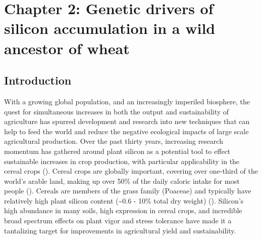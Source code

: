 \documentclass[12pt, letterpaper, ]{report}
\begin{document}
\clearpage



\chapter{Chapter 2: Genetic drivers of silicon accumulation in a wild ancestor of wheat}

\section{Introduction}

With a growing global population, and an increasingly imperiled biosphere, the quest for simultaneous increases in both the output and sustainability of agriculture has spurred development and research into new techniques that can help to feed the world and reduce the negative ecological impacts of large scale agricultural production. Over the past thirty years, increasing research momentum has gathered around plant silicon as a potential tool to effect sustainable increases in crop production, with particular applicability in the cereal crops (\cite{reynolds_silicon_2016,christian_breeding_2022}). Cereal crops are globally important, covering over one-third of the world’s arable land, making up over 50\% of the daily caloric intake for most people (\cite{faostat, rudel_agricultural_2009, awika_major_2011}). Cereals are members of the grass family (Poaceae) and typically have relatively high plant silicon content (\sim0.6 - 10\% total dry weight) (\cite{reynolds_silicon_2016}). Silicon's high abundance in many soils, high expression in cereal crops, and incredible broad spectrum effects on plant vigor and stress tolerance have made it a tantalizing target for improvements in agricultural yield and sustainability. 
\end{document}
